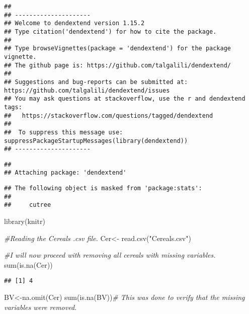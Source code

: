 \documentclass[
]{article}
\newenvironment{Shaded}{\begin{snugshade}}{\end{snugshade}}
\newcommand{\CommentTok}[1]{\textcolor[rgb]{0.56,0.35,0.01}{\textit{#1}}}
\newcommand{\FunctionTok}[1]{\textcolor[rgb]{0.00,0.00,0.00}{#1}}
\newcommand{\NormalTok}[1]{#1}
\newcommand{\OtherTok}[1]{\textcolor[rgb]{0.56,0.35,0.01}{#1}}
\newcommand{\StringTok}[1]{\textcolor[rgb]{0.31,0.60,0.02}{#1}}
\begin{document}
\begin{verbatim}
## 
## ---------------------
## Welcome to dendextend version 1.15.2
## Type citation('dendextend') for how to cite the package.
## 
## Type browseVignettes(package = 'dendextend') for the package vignette.
## The github page is: https://github.com/talgalili/dendextend/
## 
## Suggestions and bug-reports can be submitted at: https://github.com/talgalili/dendextend/issues
## You may ask questions at stackoverflow, use the r and dendextend tags: 
##   https://stackoverflow.com/questions/tagged/dendextend
## 
##  To suppress this message use:  suppressPackageStartupMessages(library(dendextend))
## ---------------------
\end{verbatim}

\begin{verbatim}
## 
## Attaching package: 'dendextend'
\end{verbatim}

\begin{verbatim}
## The following object is masked from 'package:stats':
## 
##     cutree
\end{verbatim}

\begin{Shaded}
\begin{Highlighting}[]
\FunctionTok{library}\NormalTok{(knitr)}
\end{Highlighting}
\end{Shaded}

\begin{Shaded}
\begin{Highlighting}[]
\CommentTok{\#Reading the Cereals .csv file. }
\NormalTok{Cer}\OtherTok{\textless{}{-}} \FunctionTok{read.csv}\NormalTok{(}\StringTok{"Cereals.csv"}\NormalTok{)}
\end{Highlighting}
\end{Shaded}

\begin{Shaded}
\begin{Highlighting}[]
\CommentTok{\#I will now proceed with removing all cereals with missing variables.}
\FunctionTok{sum}\NormalTok{(}\FunctionTok{is.na}\NormalTok{(Cer))}
\end{Highlighting}
\end{Shaded}

\begin{verbatim}
## [1] 4
\end{verbatim}

\begin{Shaded}
\begin{Highlighting}[]
\NormalTok{BV}\OtherTok{\textless{}{-}}\FunctionTok{na.omit}\NormalTok{(Cer)}
\FunctionTok{sum}\NormalTok{(}\FunctionTok{is.na}\NormalTok{(BV))}\CommentTok{\# This was done to verify that the missing variables were removed.}
\end{Highlighting}
\end{Shaded}
\end{document}
